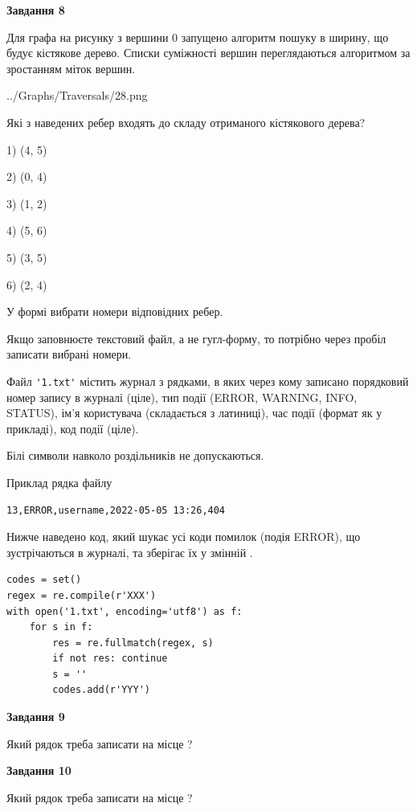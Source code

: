 \documentclass[12pt, ukrainian]{article}
\def\code#1{\Verb!#1!}
\begin{document}
{\begin {large}
{\begin {center}\textbf{Завдання 8}\end {center}}\par
Для графа на рисунку з вершини 0 запущено алгоритм пошуку в ширину, що будує кістякове дерево. Списки суміжності вершин переглядаються алгоритмом за зростанням міток вершин.\par
\begin{center}
	{../Graphs/Traversals/28.png}
\end{center}
\par Які з наведених ребер входять до складу отриманого кістякового дерева?\par
1) (4, 5)\par
2) (0, 4)\par
3) (1, 2)\par
4) (5, 6)\par
5) (3, 5)\par
6) (2, 4)\par
{\vskip 15pt} У формі вибрати номери відповідних ребер.


Якщо заповнюєте текстовий файл, а не гугл-форму, то потрібно через пробіл записа\-ти вибрані номери.\par
\newpage


Файл \code{'1.txt'} містить журнал з рядками, в яких через кому записано поряд\-ко\-вий номер запису в журналі (ціле), тип події (ERROR, WARNING, INFO, STATUS), ім'я користувача (складається з латиниці), час події (фор\-мат як у прикладі), код події (ціле).

Білі символи навколо роздільників не допускаються.

Приклад рядка файлу



\begin{verbatim}
13,ERROR,username,2022-05-05 13:26,404
\end{verbatim}


Нижче наведено код, який шукає усі коди помилок (подія ERROR), що зустріча\-ють\-ся в журналі, та зберігає їх у змінній .



\begin{verbatim}
codes = set()
regex = re.compile(r'XXX')
with open('1.txt', encoding='utf8') as f:
    for s in f:
        res = re.fullmatch(regex, s)
        if not res: continue
        s = ''
        codes.add(r'YYY')
\end{verbatim}


{\begin {center}\textbf{Завдання 9}\end {center}}\par
Який рядок треба записати на місце  ?\par
\vspace{5mm}


{\begin {center}\textbf{Завдання 10}\end {center}}\par
Який рядок треба записати на місце  ?\par


\newpage


\end {large}}
\end{document}
